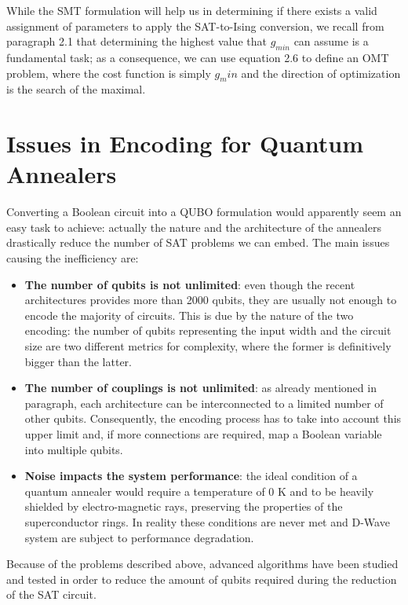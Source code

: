 While the SMT formulation will help us in determining if there exists a valid assignment of parameters to apply the SAT-to-Ising conversion, we recall from paragraph 2.1 that determining the highest value that $g_{min}$ can assume is a fundamental task; as a consequence, we can use equation 2.6 to define an OMT problem, where the cost function is simply $g_min$ and the direction of optimization is the search of the maximal.

\section{Issues in Encoding for Quantum Annealers}

Converting a Boolean circuit into a QUBO formulation would apparently seem an easy task to achieve: actually the nature and the architecture of the annealers drastically reduce the number of SAT problems we can embed. The main issues causing the inefficiency are:

\begin{itemize}
    \item \textbf{The number of qubits is not unlimited}: even though the recent architectures provides more than 2000 qubits, they are usually not enough to encode the majority of circuits.
    This is due by the nature of the two encoding: the number of qubits representing the input width and the circuit size are two different metrics for complexity, where the former is definitively bigger than the latter. 
    \item \textbf{The number of couplings is not unlimited}: as already mentioned in paragraph, each architecture can be interconnected to a limited number of other qubits. Consequently, the encoding process has to take into account this upper limit and, if more connections are required, map a Boolean variable into multiple qubits.
    \item \textbf{Noise impacts the system performance}: the ideal condition of a quantum annealer would require a temperature of 0 K and to be heavily shielded by electro-magnetic rays, preserving the properties of the superconductor rings. In reality these conditions are never met and D-Wave system are subject to performance degradation.
\end{itemize}

Because of the problems described above, advanced algorithms have been studied and tested in order to reduce the amount of qubits required during the reduction of the SAT circuit.

